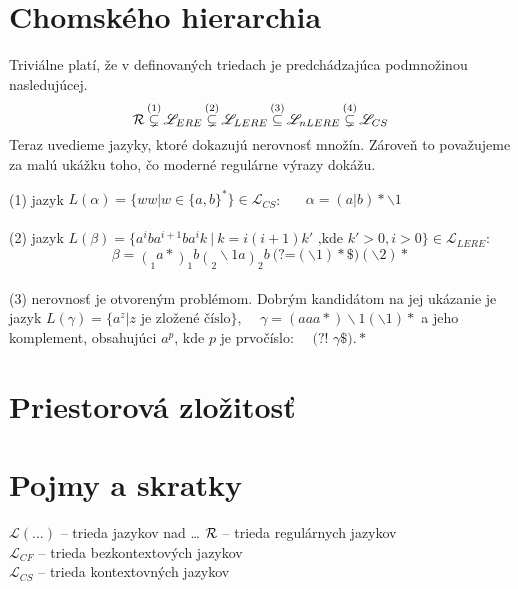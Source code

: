 \documentclass[myposter,portrait,plainboxedsections]{sciposter}
\def\R{{\cal R}} %
\def\L{\mathscr{L}} %
\def\el{\mathscr{L}_{ERE}}
\def\lel{\mathscr{L}_{LERE}}
\def\nlel{\mathscr{L}_{nLERE}}
\def\lookahead{\text{(?=}}
\def\nlookahead{\text{(?!~}}
\def\mysection#1{
{\color{sectionCol}\section*{\sc\bfseries #1}}}
\begin{document}
\begin{multicols*}{3}
\mysection{Chomského hierarchia}
Triviálne platí, že v definovaných triedach je predchádzajúca podmnožinou nasledujúcej.
$$\R \mathop{\subsetneq}^{(1)} \el \mathop{\subsetneq}^{(2)} \lel \mathop{\subseteq}^{(3)} \nlel \mathop{\subsetneq}^{(4)} \L_{CS}$$
Teraz uvedieme jazyky, ktoré dokazujú nerovnosť množín. Zároveň to považujeme za malú ukážku toho, čo moderné regulárne výrazy dokážu.

(1) jazyk $L(\alpha) = \lbrace ww|w \in\lbrace a,b \rbrace^* \rbrace \in \L_{CS}$:~~~ $\alpha = (a|b)*\backslash 1$
\\ \\
(2) jazyk $L(\beta)=\lbrace a^iba^{i+1}ba^ik ~|~ k=i(i+1)k' \text{ ,kde } k'>0,i>0\rbrace \in \lel$: 
$$\beta=\mathop{(}_1 a*\mathop{)}_1 b \mathop{(}_2 \backslash 1 a \mathop{)}_2 b~ \lookahead (\backslash 1) *\$ ) (\backslash 2)* $$
\\ 
(3) nerovnosť je otvoreným problémom. Dobrým kandidátom na jej ukázanie je jazyk $L(\gamma) = \lbrace a^z | z \text{ je zložené číslo} \rbrace$, ~~$\gamma = (aaa*)\backslash 1(\backslash 1)*$ a jeho komplement, obsahujúci $a^p$, kde $p$ je prvočíslo: ~~$\nlookahead \gamma\$).*$


\mysection{Priestorová zložitosť}

\mysection{Pojmy a skratky}
$\L(\dots)$ -- trieda jazykov nad \dots
$\R$ -- trieda regulárnych jazykov
\\ $\L_{CF}$ -- trieda bezkontextových jazykov
\\ $\L_{CS}$ -- trieda kontextovných jazykov


\nocite{*}


\end{multicols*}
\end{document}
